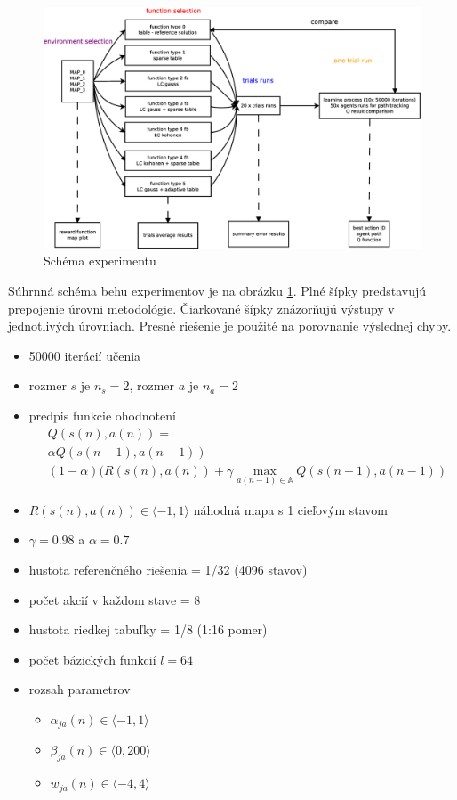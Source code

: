 \begin{figure}[!htb]
\center
\includegraphics[scale=.3]{../diagrams/experiment_map_q_learning.eps}
\caption{Schéma experimentu}
\label{img:experiment_schem}
\end{figure}

Súhrnná schéma behu experimentov je na obrázku \ref{img:experiment_schem}.
Plné šípky predstavujú prepojenie úrovni metodológie. Čiarkované šípky znázorňujú
výstupy v jednotlivých úrovniach. Presné riešenie je použité na porovnanie výslednej chyby.



\begin{itemize}
\item 50000 iterácií učenia
\item rozmer $s$ je $n_s = 2$, rozmer $a$ je $n_a = 2$
\item predpis funkcie ohodnotení
\begin{align}
&Q(s(n),a(n)) = \nonumber \\
&\alpha Q(s(n-1),a(n-1)) \nonumber \\
&(1- \alpha)(R(s(n),a(n)) + \gamma \max_{a(n-1) \in \mathbb{A}} Q(s(n-1), a(n-1)) \nonumber
\end{align}

\item $R(s(n), a(n)) \in \langle -1, 1 \rangle$ náhodná mapa s 1 cieľovým stavom
\item $\gamma = 0.98$ a $\alpha = 0.7$
\item hustota referenčného riešenia = 1/32  (4096 stavov)
\item počet akcií v každom stave = 8
\item hustota riedkej tabuľky = 1/8  (1:16 pomer)
\item počet bázických funkcií $l = 64$
\item rozsah parametrov
    \begin{itemize}
      \item $\alpha_{ja}(n) \in \langle -1, 1 \rangle$
      \item $\beta_{ja}(n) \in \langle 0, 200 \rangle$
      \item $w_{ja}(n) \in \langle -4, 4 \rangle$
    \end{itemize}
\end{itemize}

